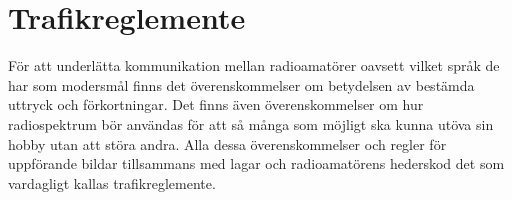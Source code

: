 \chapter{Trafikreglemente}
\label{ch:trafikreglemente}

För att underlätta kommunikation mellan radioamatörer oavsett vilket språk de
har som modersmål finns det överenskommelser om betydelsen av bestämda uttryck
och förkortningar.
Det finns även överenskommelser om hur radiospektrum bör användas för att så
många som möjligt ska kunna utöva sin hobby utan att störa andra.
Alla dessa överenskommelser och regler för uppförande bildar tillsammans med
lagar och radioamatörens hederskod det som vardagligt kallas trafikreglemente.
